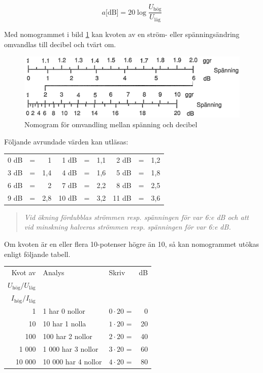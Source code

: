 \begin{equation*}
	a\text{[dB]} = 20\log \dfrac{U_\text{hög}}{U_\text{låg}}
\end{equation*}

Med nomogrammet i bild \ref{ellära-nomogram-db-spänning} kan kvoten av en
ström- eller spänningsändring omvandlas till decibel och tvärt om.

\begin{figure}
  \includegraphics[width=\textwidth]{images/nomogram_db_spanning.png}
  \caption{Nomogram för omvandling mellan spänning och decibel}
  \label{ellära-nomogram-db-spänning}
\end{figure}

Följande avrundade värden kan utläsas:

\begin{tabular}{rcr|rcr|rcr}
	0 dB & = &   1 &  1 dB & = & 1,1 &  2 dB & = & 1,2 \\
	3 dB & = & 1,4 &  4 dB & = & 1,6 &  5 dB & = & 1,8 \\
	6 dB & = &   2 &  7 dB & = & 2,2 &  8 dB & = & 2,5 \\
	9 dB & = & 2,8 & 10 dB & = & 3,2 & 11 dB & = & 3,6
\end{tabular}

\begin{quote}\emph{
Vid ökning fördubblas strömmen resp. spänningen för var 6:e dB och att
vid minskning halveras strömmen resp. spänningen för var 6:e dB.
}\end{quote}

Om kvoten är en eller flera 10-potenser högre än 10, så kan nomogrammet utökas
enligt följande tabell.

\begin{tabular}{rllr}
Kvot av & Analys             & Skriv            & dB \\
\(U_\text{hög}/U_\text{låg}\) &          &                  &    \\
\(I_\text{hög}/I_\text{låg}\) &          &                  &    \\
     1 & 1 har 0 nollor      & \(0 \cdot 20\) = &  0 \\
    10 & 10 har 1 nolla      & \(1 \cdot 20\) = & 20 \\
   100 & 100 har 2 nollor    & \(2 \cdot 20\) = & 40 \\
 1 000 &  1 000 har 3 nollor & \(3 \cdot 20\) = & 60 \\
10 000 & 10 000 har 4 nollor & \(4 \cdot 20\) = & 80
\end{tabular}

